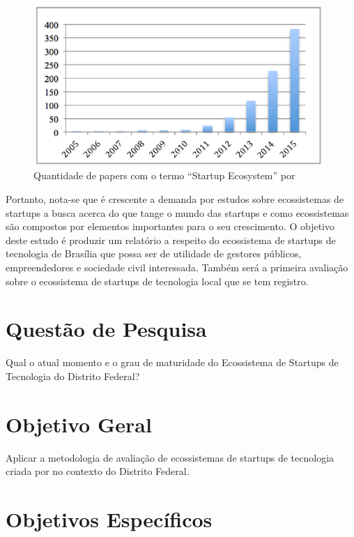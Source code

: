 \begin{figure}[!htb]
	\centering
	\includegraphics[width=11cm,angle=0]{figuras/papers_about_startup_ecosystems}
	\caption{Quantidade de papers com o termo ``Startup Ecosystem'' por }
	\label{figure:papers_about_startup_ecosystems}
\end{figure}

Portanto, nota-se que é crescente a demanda por estudos sobre ecossistemas de startups a busca acerca do que tange o mundo das startups e como ecossistemas são compostos por elementos importantes para o seu crescimento. O objetivo deste estudo é produzir um relatório a respeito do ecossistema de startups de tecnologia de Brasília que possa ser de utilidade de gestores públicos, empreendedores e sociedade civil interessada. Também será a primeira avaliação sobre o ecossistema de startups de tecnologia local que se tem registro.

\section{Questão de Pesquisa}
\label{section:questao_de_pesquisa}

Qual o atual momento e o grau de maturidade do Ecossistema de Startups de Tecnologia do Distrito Federal?

\section{Objetivo Geral}
\label{section:objetivo_geral}

Aplicar a metodologia de avaliação de ecossistemas de startups de tecnologia criada por  no contexto do Distrito Federal.

\section{Objetivos Específicos}
\label{section:objetivos_especificos}

